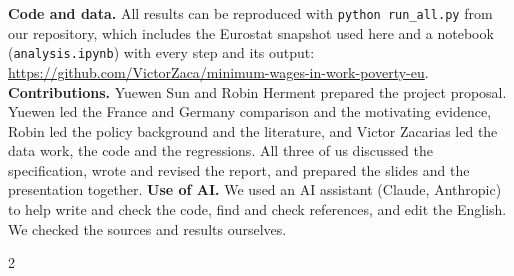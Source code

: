 \documentclass[10pt,a4paper]{article}
\begin{document}
\vspace{3pt}
{\small\noindent\textbf{Code and data.} All results can be reproduced with \texttt{python run\_all.py} from our repository, which includes the Eurostat snapshot used here and a notebook (\texttt{analysis.ipynb}) with every step and its output: \url{https://github.com/VictorZaca/minimum-wages-in-work-poverty-eu}.
\textbf{Contributions.} Yuewen Sun and Robin Herment prepared the project proposal. Yuewen led the France and Germany comparison and the motivating evidence, Robin led the policy background and the literature, and Victor Zacarias led the data work, the code and the regressions. All three of us discussed the specification, wrote and revised the report, and prepared the slides and the presentation together.
\textbf{Use of AI.} We used an AI assistant (Claude, Anthropic) to help write and check the code, find and check references, and edit the English. We checked the sources and results ourselves.\par}

\begin{multicols}{2}
\scriptsize


\end{multicols}
\end{document}
